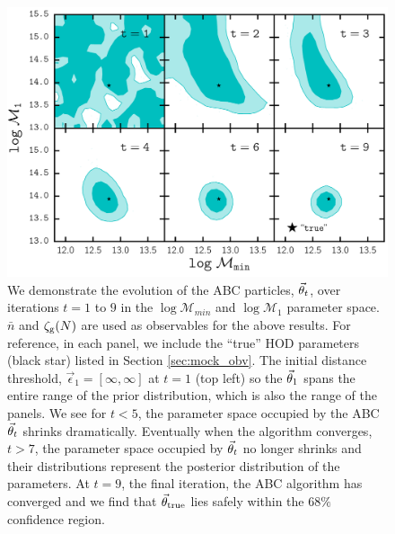 \begin{figure}
\includegraphics[width=1.\textwidth]{figs/abc/paper_ABC_poolevolution_nbargmf.pdf}
\caption{\label{fig:pool_demo} We demonstrate the evolution of the ABC particles, $\vec{\theta}_t$, over iterations $t = 1$ to $9$ in the $\log \mathcal{M}_{min}$ and $\log \mathcal{M}_1$ parameter space. 
$\bar{n}$ and $\mathcal{\zeta}_{\rm g}(N)$ are used as observables for the above results. For reference, 
in each panel, we include the ``true'' HOD parameters (black star) listed in 
Section \ref{sec:mock_obv}. The initial distance threshold, $\vec\epsilon_1 = 
[\infty, \infty]$ at $t=1$ (top left) so the $\vec{\theta}_1$ spans the entire range of the prior distribution, 
which is also the range of the panels. We see for $t < 5$, the parameter space occupied 
by the ABC $\vec{\theta}_t$ shrinks dramatically. Eventually when the algorithm converges, 
$t > 7$, the parameter space occupied by $\vec{\theta}_t$ no longer shrinks and their 
distributions represent the posterior distribution of the 
parameters. At $t=9$, the final iteration, the ABC algorithm has converged and 
we find that $\vec{\theta}_\mathrm{true}$ lies safely within the $68\%$ confidence region.} 
\end{figure}

